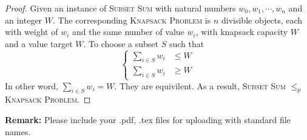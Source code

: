 \documentclass[12pt,a4paper]{article}
\theoremstyle{definition}
\begin{document}
\begin{enumerate}
\begin{proof}

        Given an instance of \textsc{Subset Sum} with natural numbers $w_0,w_1,\cdots,w_n$ and an integer $W$. The corresponding \textsc{Knapsack Problem} is $n$ divisible objects, each with weight of $w_i$ and the same number of value $w_i$, with knapsack capacity $W$ and a value target $W$. To choose a subset $S$ such that
        \begin{equation*}
            \begin{cases}
                \sum_{i\in S} w_i &\leq W \\
                \sum_{i\in S} w_i &\geq W
            \end{cases}
        \end{equation*}
        In other word, $\sum_{i\in S}w_i = W$. They are equivilent. As a result, \textsc{Subset Sum} $\leq_p$ \textsc{Knapsack Problem}.
    \end{proof}
    
\end{enumerate}


\textbf{Remark:} Please include your .pdf, .tex files for uploading with standard file names.


\end{document}
